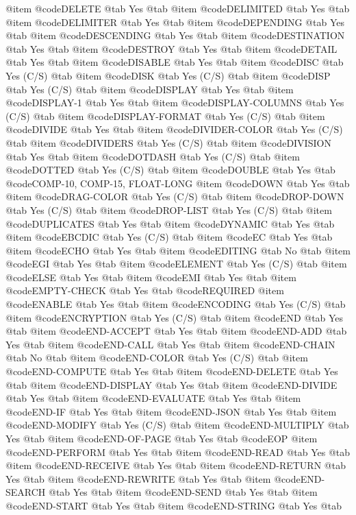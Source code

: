 @item @code{DELETE} @tab Yes @tab 
@item @code{DELIMITED} @tab Yes @tab 
@item @code{DELIMITER} @tab Yes @tab 
@item @code{DEPENDING} @tab Yes @tab 
@item @code{DESCENDING} @tab Yes @tab 
@item @code{DESTINATION} @tab Yes @tab 
@item @code{DESTROY} @tab Yes @tab 
@item @code{DETAIL} @tab Yes @tab 
@item @code{DISABLE} @tab Yes @tab 
@item @code{DISC} @tab Yes	(C/S) @tab 
@item @code{DISK} @tab Yes	(C/S) @tab 
@item @code{DISP} @tab Yes	(C/S) @tab 
@item @code{DISPLAY} @tab Yes @tab 
@item @code{DISPLAY-1} @tab Yes @tab 
@item @code{DISPLAY-COLUMNS} @tab Yes	(C/S) @tab 
@item @code{DISPLAY-FORMAT} @tab Yes	(C/S) @tab 
@item @code{DIVIDE} @tab Yes @tab 
@item @code{DIVIDER-COLOR} @tab Yes	(C/S) @tab 
@item @code{DIVIDERS} @tab Yes	(C/S) @tab 
@item @code{DIVISION} @tab Yes @tab 
@item @code{DOTDASH} @tab Yes	(C/S) @tab 
@item @code{DOTTED} @tab Yes	(C/S) @tab 
@item @code{DOUBLE} @tab Yes @tab @code{COMP-10, COMP-15, FLOAT-LONG}
@item @code{DOWN} @tab Yes @tab 
@item @code{DRAG-COLOR} @tab Yes	(C/S) @tab 
@item @code{DROP-DOWN} @tab Yes	(C/S) @tab 
@item @code{DROP-LIST} @tab Yes	(C/S) @tab 
@item @code{DUPLICATES} @tab Yes @tab 
@item @code{DYNAMIC} @tab Yes @tab 
@item @code{EBCDIC} @tab Yes	(C/S) @tab 
@item @code{EC} @tab Yes @tab 
@item @code{ECHO} @tab Yes @tab 
@item @code{EDITING} @tab No @tab 
@item @code{EGI} @tab Yes @tab 
@item @code{ELEMENT} @tab Yes	(C/S) @tab 
@item @code{ELSE} @tab Yes @tab 
@item @code{EMI} @tab Yes @tab 
@item @code{EMPTY-CHECK} @tab Yes @tab @code{REQUIRED}
@item @code{ENABLE} @tab Yes @tab 
@item @code{ENCODING} @tab Yes	(C/S) @tab 
@item @code{ENCRYPTION} @tab Yes	(C/S) @tab 
@item @code{END} @tab Yes @tab 
@item @code{END-ACCEPT} @tab Yes @tab 
@item @code{END-ADD} @tab Yes @tab 
@item @code{END-CALL} @tab Yes @tab 
@item @code{END-CHAIN} @tab No @tab 
@item @code{END-COLOR} @tab Yes	(C/S) @tab 
@item @code{END-COMPUTE} @tab Yes @tab 
@item @code{END-DELETE} @tab Yes @tab 
@item @code{END-DISPLAY} @tab Yes @tab 
@item @code{END-DIVIDE} @tab Yes @tab 
@item @code{END-EVALUATE} @tab Yes @tab 
@item @code{END-IF} @tab Yes @tab 
@item @code{END-JSON} @tab Yes @tab 
@item @code{END-MODIFY} @tab Yes	(C/S) @tab 
@item @code{END-MULTIPLY} @tab Yes @tab 
@item @code{END-OF-PAGE} @tab Yes @tab @code{EOP}
@item @code{END-PERFORM} @tab Yes @tab 
@item @code{END-READ} @tab Yes @tab 
@item @code{END-RECEIVE} @tab Yes @tab 
@item @code{END-RETURN} @tab Yes @tab 
@item @code{END-REWRITE} @tab Yes @tab 
@item @code{END-SEARCH} @tab Yes @tab 
@item @code{END-SEND} @tab Yes @tab 
@item @code{END-START} @tab Yes @tab 
@item @code{END-STRING} @tab Yes @tab 

